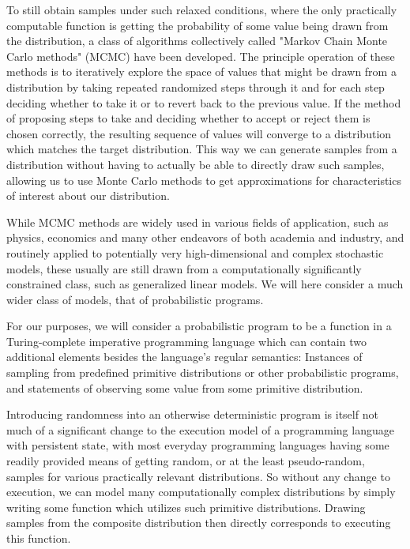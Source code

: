 To still obtain samples under such relaxed conditions, where the only practically computable function is getting the probability of some value being drawn from the distribution, a class of algorithms collectively called "Markov Chain Monte Carlo methods" (MCMC) have been developed. The principle operation of these methods is to iteratively explore the space of values that might be drawn from a distribution by taking repeated randomized steps through it and for each step deciding whether to take it or to revert back to the previous value. If the method of proposing steps to take and deciding whether to accept or reject them is chosen correctly, the resulting sequence of values will converge to a distribution which matches the target distribution. This way we can generate samples from a distribution without having to actually be able to directly draw such samples, allowing us to use Monte Carlo methods to get approximations for characteristics of interest about our distribution.

While MCMC methods are widely used in various fields of application, such as physics, economics and many other endeavors of both academia and industry, and routinely applied to potentially very high-dimensional and complex stochastic models, these usually are still drawn from a computationally significantly constrained class, such as generalized linear models. We will here consider a much wider class of models, that of probabilistic programs.

For our purposes, we will consider a probabilistic program to be a function in a Turing-complete imperative programming language which can contain two additional elements besides the language's regular semantics: Instances of sampling from predefined primitive distributions or other probabilistic programs, and statements of observing some value from some primitive distribution.

Introducing randomness into an otherwise deterministic program is itself not much of a significant change to the execution model of a programming language with persistent state, with most everyday programming languages having some readily provided means of getting random, or at the least pseudo-random, samples for various practically relevant distributions. So without any change to execution, we can model many computationally complex distributions by simply writing some function which utilizes such primitive distributions. Drawing samples from the composite distribution then directly corresponds to executing this function.

